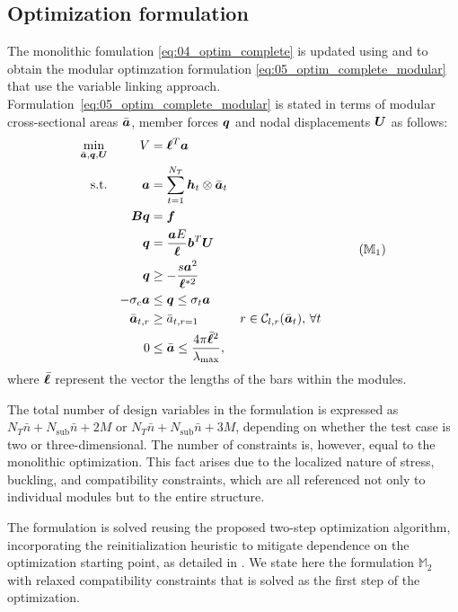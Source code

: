 \subsection{Optimization formulation}
The monolithic fomulation \ref{eq:04_optim_complete} is updated using  and  to obtain the modular optimzation formulation \ref{eq:05_optim_complete_modular} that use the variable linking approach. Formulation~\ref{eq:05_optim_complete_modular} is stated in terms of modular cross-sectional areas $\bar{\bm{a}}$, member forces $\bm{q}$ and nodal displacements $\bm{U}$ as follows:
\begin{equation}
    \begin{aligned}
    \min_{\bar{\vect{a}}, \vect{q}, \vect{U}}   && V &= \vect{\ell}^{T}\vect{a}\\
    \textrm{s.t.}  && \vect{a} &= \sum_{t=1}^{N_T} \vect{h}_t\otimes\bar{\vect{a}}_t \\ 
    && \matr{B}\vect{q} &= \vect{f} && \\
    && \vect{q} &= \frac{\vect{a}E}{\vect{\ell}}\vect{b}^T\vect{U} &&  \\
    && \vect{q} &\geq -\frac{s\vect{a}^2}{\vect{\ell}^{*2}} &&  \\
    && -\sigma_c\vect{a} &\leq \vect{q} \leq \sigma_t\vect{a} &&  \\
    && \bar{\vect{a}}_{t,r}&\geq \bar{a}_{t,r=1} && r \in \mathcal{C}_{l,r}(\bar{\vect{a}}_t),\, \forall t \\
    && 0 &\leq \bar{\vect{a}} \leq \frac{4 \pi \bar{\vect{\ell}}^2}{\lambda_{\text{max}}}, \\
    \end{aligned}
    \tag{${\mathbb{M}}_\text{1}$}
    \label{eq:05_optim_complete_modular}
\end{equation}
where $\bar{\bm{\ell}}$ represent the vector the lengths of the bars within the modules.

The total number of design variables in the formulation is expressed as $N_T\bar{n} + N_{\text{sub}}\bar{n} + 2M$ or $N_T\bar{n} + N_{\text{sub}}\bar{n} + 3M$, depending on whether the test case is two or three-dimensional. The number of constraints is, however, equal to the monolithic optimization. This fact arises due to the localized nature of stress, buckling, and compatibility constraints, which are all referenced not only to individual modules but to the entire structure.

The formulation is solved reusing the proposed two-step optimization algorithm, incorporating the reinitialization heuristic to mitigate dependence on the optimization starting point, as detailed in . We state here the formulation $\mathbb{M}_\text{2}$ with relaxed compatibility constraints that is solved as the first step of the optimization. 

